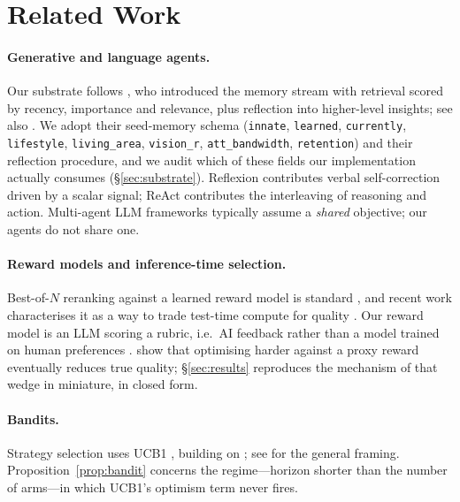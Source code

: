 \documentclass[11pt]{article}
\newcommand{\code}[1]{\texttt{\small #1}}
\theoremstyle{plain}
\theoremstyle{definition}
\begin{document}
\section{Related Work}
\paragraph{Generative and language agents.}
Our substrate follows \citet{park2023generative}, who introduced the memory
stream with retrieval scored by recency, importance and relevance, plus
reflection into higher-level insights; see also \citet{park2022social}. We adopt
their seed-memory schema (\code{innate}, \code{learned}, \code{currently},
\code{lifestyle}, \code{living\_area}, \code{vision\_r}, \code{att\_bandwidth},
\code{retention}) and their reflection procedure, and we audit which of these
fields our implementation actually consumes (\S\ref{sec:substrate}). Reflexion
\citep{shinn2023reflexion} contributes verbal self-correction driven by a
scalar signal; ReAct \citep{yao2023react} contributes the interleaving of
reasoning and action. Multi-agent LLM frameworks
\citep{li2023camel,hong2024metagpt,wu2024autogen,du2024debate} typically assume
a \emph{shared} objective; our agents do not share one.

\paragraph{Reward models and inference-time selection.}
Best-of-$N$ reranking against a learned reward model is standard
\citep{nakano2021webgpt,cobbe2021training}, and recent work characterises it as
a way to trade test-time compute for quality \citep{snell2025scaling}. Our
reward model is an LLM scoring a rubric, i.e.\ AI feedback
\citep{bai2022constitutional,lee2024rlaif} rather than a model trained on human
preferences \citep{christiano2017deep,stiennon2020learning,ouyang2022training}.
\citet{gao2023scaling} show that optimising harder against a proxy reward
eventually reduces true quality; \S\ref{sec:results} reproduces the mechanism of
that wedge in miniature, in closed form.

\paragraph{Bandits.}
Strategy selection uses UCB1 \citep{auer2002finite}, building on
\citet{lai1985asymptotically}; see \citet{sutton2018reinforcement} for the
general framing. Proposition~\ref{prop:bandit} concerns the regime---horizon
shorter than the number of arms---in which UCB1's optimism term never fires.
\end{document}
